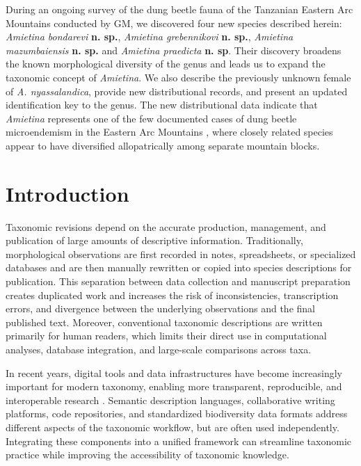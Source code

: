 During an ongoing survey of the dung beetle fauna of the Tanzanian Eastern Arc Mountains conducted by GM, we discovered four new species described herein: \textit{Amietina bondarevi} \textbf{n. sp.}, \textit{Amietina grebennikovi} \textbf{n. sp.}, \textit{Amietina mazumbaiensis} \textbf{n. sp.} and \textit{Amietina praedicta} \textbf{n. sp}. Their discovery broadens the known morphological diversity of the genus and leads us to expand the taxonomic concept of \textit{Amietina}. We also describe the previously unknown female of \textit{A. nyassalandica}, provide new distributional records, and present an updated identification key to the genus. The new distributional data indicate that \textit{Amietina} represents one of the few documented cases of dung beetle microendemism in the Eastern Arc Mountains \citep{montanaro2024microallopatric}, where closely related species appear to have diversified allopatrically among separate mountain blocks.




\section*{Introduction}
Taxonomic revisions depend on the accurate production, management, and publication of large amounts of descriptive information. Traditionally, morphological observations are first recorded in notes, spreadsheets, or specialized databases and are then manually rewritten or copied into species descriptions for publication. This separation between data collection and manuscript preparation creates duplicated work and increases the risk of inconsistencies, transcription errors, and divergence between the underlying observations and the final published text. Moreover, conventional taxonomic descriptions are written primarily for human readers, which limits their direct use in computational analyses, database integration, and large-scale comparisons across taxa.

In recent years, digital tools and data infrastructures have become increasingly important for modern taxonomy, enabling more transparent, reproducible, and interoperable research \citep{penev2017strategies, smith2013cybertaxonomy}. Semantic description languages, collaborative writing platforms, code repositories, and standardized biodiversity data formats address different aspects of the taxonomic workflow, but are often used independently. Integrating these components into a unified framework can streamline taxonomic practice while improving the accessibility of taxonomic knowledge.

